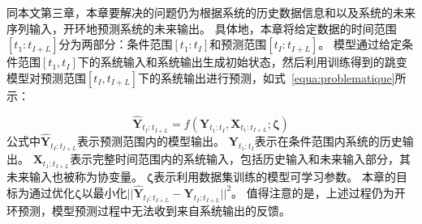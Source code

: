 同本文第三章，本章要解决的问题仍为根据系统的历史数据信息和以及系统的未来序列输入，开环地预测系统的未来输出。
具体地，本章将给定数据的时间范围$[t_1:t_{I+L}]$分为两部分：条件范围$[t_1:t_{I}]$和预测范围$[t_{I}:t_{I+L}]$。
模型通过给定条件范围$[t_1, t_I]$下的系统输入和系统输出生成初始状态，然后利用训练得到的跳变模型对预测范围$[t_{I}, t_{I+L}]$下的系统输出进行预测，如式~\ref{equa:problematique}所示：

\begin{equation}
\label{equa:problematique}
    \hat{\boldsymbol Y}_{t_{I}:t_{I+L}} = f(\boldsymbol Y_{t_{1}:t_{I}}, \boldsymbol X_{t_{1}:t_{I+L}};\boldsymbol \zeta) 
\end{equation}
公式中$\hat{\boldsymbol Y}_{t_{I}:t_{I+L}}$表示预测范围内的模型输出。 
$\boldsymbol Y_{t_{1}:t_{I}}$表示在条件范围内系统的历史输出。
$\boldsymbol X_{t_{1}:t_{I+L}}$表示完整时间范围内的系统输入，包括历史输入和未来输入部分，其未来输入也被称为协变量\cite{Wu2020}。
$\boldsymbol \zeta$表示利用数据集训练的模型可学习参数。
本章的目标为通过优化$\boldsymbol \zeta$以最小化$||\hat{\boldsymbol Y}_{t_{I}:t_{I+L}}-\boldsymbol {Y}_{t_{I}:t_{I+L}}||^2$。
值得注意的是，上述过程仍为开环预测，模型预测过程中无法收到来自系统输出的反馈。

